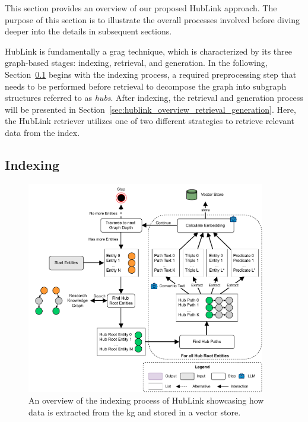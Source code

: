 
This section provides an overview of our proposed HubLink approach. The purpose of this section is to illustrate the overall processes involved before diving deeper into the details in subsequent sections.

HubLink is fundamentally a \gls{grag} technique, which is characterized by its three graph-based stages: indexing, retrieval, and generation. In the following, Section~\ref{sec:hublink_indexing_process_overview} begins with the indexing process, a required preprocessing step that needs to be performed before retrieval to decompose the graph into subgraph structures referred to as \emph{hubs}. After indexing, the retrieval and generation process will be presented in Section~\ref{sec:hublink_overview_retrieval_generation}. Here, the HubLink retriever utilizes one of two different strategies to retrieve relevant data from the index. 

\subsection{Indexing}
\label{sec:hublink_indexing_process_overview}

\begin{figure}[t]
    \centering
    \includegraphics[width=0.93\textwidth]{figures/hublink/Hublink_figures-Overview_indexing.drawio.pdf}
    \caption[Overview of the Indexing Process]{An overview of the indexing process of HubLink showcasing how data is extracted from the \gls{kg} and stored in a vector store.}
    \label{fig:hublink_overview_indexing}
\end{figure}

